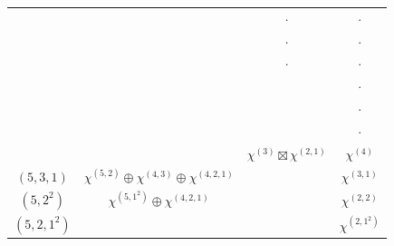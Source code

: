 \documentclass[11pt]{article}
\theoremstyle{definition}
\numberwithin{equation}{section}
\begin{document}
\begin{figure}[H]
	\centering
	\begin{tabular}{|c|c|c|c|}
		\hline
		\makecell{$\tau$  }
		& \makecell{$\mathbb{C}_{(1^2)(1)^7}^{\tau} $} 
		& \makecell{$\mathbb{C}_{(1^2)^3(1)^3}^{\tau} $}
		&\makecell{$\mathbb{C}_{(1^2)^4(1)}^{\tau}   $}   \\
		\hline
		\makecell{$(8,1)$} & \makecell{$\chi^{(7)}$} &$\cdot$&$\cdot$\\ 
		\hline
		\makecell{$(7,2)$} & \makecell{$\chi^{(6,1)}$} &$\cdot$&$\cdot$\\ \hline
		\makecell{$(7,1^2)$} & \makecell{$\chi^{(7)}\oplus \chi^{(6,1)}$} &$\cdot$ &$\cdot$\\ \hline
		\makecell{$(6,3)$} & \makecell{$\chi^{(5,2)}$} & \makecell{$\chi^{(3)} \boxtimes \chi^{(3)}$} &$\cdot$\\ \hline
		\makecell{$(6,2,1)$} & \makecell{$\chi^{(6,1)}\oplus \chi^{(5,2)}\oplus \chi^{(5,1^2)}$ }&\makecell{$\chi^{(2,1)} \boxtimes \chi^{(3)}$}&$\cdot$\\ \hline
		\makecell{$(6,1^3)$} &\makecell{ $\chi^{(6,1)}\oplus \chi^{(5,1^2)}$} &\makecell{$\chi^{(1^3)} \boxtimes \chi^{(3)}$}& $\cdot$\\ \hline
		\makecell{$(5,4)$} & \makecell{$\chi^{(4,3)}$} &  $\chi^{(3)}\boxtimes \chi^{(2,1)}$  &$\chi^{(4)}$\\ \hline
		$(5,3,1)$ & $\chi^{(5,2)}\oplus \chi^{(4,3)}\oplus \chi^{(4,2,1)}$ &\makecell{$\substack{ (\chi^{(3)} \boxtimes \chi^{(3)})\oplus ( \chi^{(2,1)} \boxtimes \chi^{(3)}) \\ \oplus (\chi^{(3)} \boxtimes \chi^{(2,1)})\oplus (\chi^{(2,1)} \boxtimes \chi^{(2,1)})}$}& $\chi^{(3,1)}$
		\\ \hline
		$(5,2^2)$ & $\chi^{(5,1^2)}\oplus \chi^{(4,2,1)}$ &\makecell{$\substack{  ( \chi^{(2,1)} \boxtimes \chi^{(3)}) \\ \oplus (\chi^{(1^3)} \boxtimes \chi^{(3)})\oplus (\chi^{(2,1)} \boxtimes \chi^{(2,1)})}$}&$\chi^{(2,2)}$\\ \hline
		$(5,2,1^2)$ & \makecell{$\substack{\chi^{(5,2)}\oplus \chi^{(5,1^2)} \\ \oplus \chi^{(4,2,1)}\oplus \chi^{(4,1^3)}}$} &
		\makecell{$\substack{ (\chi^{(3)} \boxtimes \chi^{(3)})\oplus2 ( \chi^{(2,1)} \boxtimes \chi^{(3)}) \\ \oplus (\chi^{(1^3)}\boxtimes \chi^{(3)})\oplus (\chi^{(2,1)} \boxtimes \chi^{(2,1)})\\ \oplus (\chi^{(1^3)} \boxtimes \chi^{(2,1)})}$}
		&$\chi^{(2,1^2)}$ \\ \hline

\end{tabular}
\end{figure}
\end{document}
